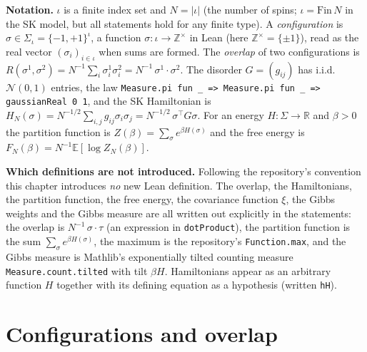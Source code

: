 \medskip\noindent\textbf{Notation.}
$\iota$ is a finite index set and $N=|\iota|$ (the number of spins; $\iota=\mathrm{Fin}\,N$ in the SK model, but all
statements hold for any finite type). A \emph{configuration} is $\sigma\in\Sigma_\iota=\{-1,+1\}^\iota$, a function
$\sigma:\iota\to\mathbb Z^\times$ in Lean (here $\mathbb Z^\times=\{\pm1\}$), read as the real vector
$(\sigma_i)_{i\in\iota}$ when sums are formed. The \emph{overlap} of two configurations is
$R(\sigma^1,\sigma^2)=N^{-1}\sum_i\sigma^1_i\sigma^2_i=N^{-1}\,\sigma^1\!\cdot\!\sigma^2$. The disorder
$G=(g_{ij})$ has i.i.d.\ $\mathcal N(0,1)$ entries, the law
\texttt{Measure.pi fun \_ => Measure.pi fun \_ => gaussianReal 0 1}, and the SK Hamiltonian is
$H_N(\sigma)=N^{-1/2}\sum_{i,j}g_{ij}\sigma_i\sigma_j=N^{-1/2}\,\sigma^\top G\sigma$. For an energy
$H:\Sigma\to\mathbb R$ and $\beta>0$ the partition function is $Z(\beta)=\sum_\sigma e^{\beta H(\sigma)}$ and the free
energy is $F_N(\beta)=N^{-1}\mathbb E[\log Z_N(\beta)]$.

\medskip\noindent\textbf{Which definitions are not introduced.}
Following the repository's convention this chapter introduces \emph{no} new Lean definition. The overlap, the
Hamiltonians, the partition function, the free energy, the covariance function $\xi$, the Gibbs weights and the
Gibbs measure are all written out explicitly in the statements: the overlap is
$N^{-1}\,\sigma\cdot\tau$ (an expression in \texttt{dotProduct}), the partition function is the sum
$\sum_\sigma e^{\beta H(\sigma)}$, the maximum is the repository's \texttt{Function.max}, and the Gibbs measure is
Mathlib's exponentially tilted counting measure \texttt{Measure.count.tilted} with tilt $\beta H$. Hamiltonians appear as an arbitrary function $H$ together with its
defining equation as a hypothesis (written \texttt{hH}).

\section{Configurations and overlap}\label{sec:sg:basic}

